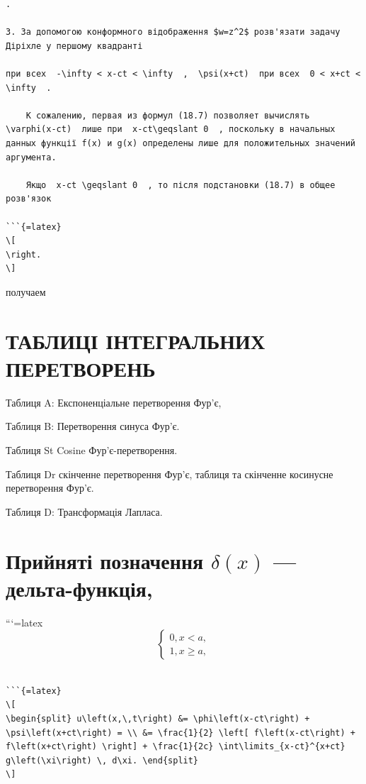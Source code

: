 \documentclass[
  ukrainian,
]{article}
\begin{document}
\begin{verbatim}
.

3. За допомогою конформного відображення $w=z^2$ розв'язати задачу Діріхле у першому квадранті

при всех  -\infty < x-ct < \infty  ,  \psi(x+ct)  при всех  0 < x+ct < \infty  .

    К сожалению, первая из формул (18.7) позволяет вычислять  \varphi(x-ct)  лише при  x-ct\geqslant 0  , поскольку в начальных данных функції f(x) и g(x) определены лише для положительных значений аргумента.

    Якщо  x-ct \geqslant 0  , то після подстановки (18.7) в общее розв'язок

```{=latex}
\[
\right.
\]
\end{verbatim}

получаем

\section{ТАБЛИЦІ ІНТЕГРАЛЬНИХ
ПЕРЕТВОРЕНЬ}\label{ux442ux430ux431ux43bux438ux446ux456-ux456ux43dux442ux435ux433ux440ux430ux43bux44cux43dux438ux445-ux43fux435ux440ux435ux442ux432ux43eux440ux435ux43dux44c}

Таблиця A: Експоненціальне перетворення Фур'є,

Таблиця B: Перетворення синуса Фур'є.

Таблиця St Cosine Фур'є-перетворення.

Таблиця Dr скінченне перетворення Фур'є, таблиця та скінченне косинусне
перетворення Фур'є.

Таблиця D: Трансформація Лапласа.

\section{\texorpdfstring{Прийняті позначення \(\delta\left(x\right)\)
---
дельта-функція,}{Прийняті позначення \textbackslash delta\textbackslash left(x\textbackslash right) --- дельта-функція,}}\label{ux43fux440ux438ux439ux43dux44fux442ux456-ux43fux43eux437ux43dux430ux447ux435ux43dux43dux44f-deltaleftxright-ux434ux435ux43bux44cux442ux430-ux444ux443ux43dux43aux446ux456ux44f}

```{=latex}
\[
\begin{cases} 0, x < a, \\ 1, x \geqslant a, \end{cases}
\]

\begin{verbatim}

```{=latex}
\[
\begin{split} u\left(x,\,t\right) &= \phi\left(x-ct\right) + \psi\left(x+ct\right) = \\ &= \frac{1}{2} \left[ f\left(x-ct\right) + f\left(x+ct\right) \right] + \frac{1}{2c} \int\limits_{x-ct}^{x+ct} g\left(\xi\right) \, d\xi. \end{split}
\]
\end{verbatim}
\end{document}
